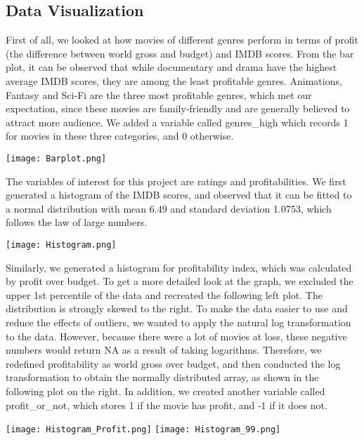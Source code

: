 \documentclass[12pt]{article}
\begin{document}
\subsection{Data Visualization}
First of all, we looked at how movies of different genres perform in terms of profit (the difference between world gross and budget) and IMDB scores. From the bar plot, it can be observed that while documentary and drama have the highest average IMDB scores, they are among the least profitable genres. Animations, Fantasy and Sci-Fi are the three most profitable genres, which met our expectation, since these movies are family-friendly and are generally believed to attract more audience. We added a variable called genres\_high which records 1 for movies in these three categories, and 0 otherwise. \par
\begin{center}
\texttt{[image: Barplot.png]}\\
\end{center}
\par
The variables of interest for this project are ratings and profitabilities. We first generated a histogram of the IMDB scores, and observed that it can be fitted to a normal distribution with mean 6.49 and standard deviation 1.0753, which follows the law of large numbers. 
\begin{center}
\texttt{[image: Histogram.png]}\\
\end{center}
\par
Similarly, we generated a histogram for profitability index, which was calculated by profit over budget. To get a more detailed look at the graph, we excluded the upper 1st percentile of the data and recreated the following left plot. The distribution is strongly skewed to the right. To make the data easier to use and reduce the effects of outliers, we wanted to apply the natural log transformation to the data. However, because there were a lot of movies at loss, these negative numbers would return NA as a result of taking logarithms. Therefore, we redefined profitability as world gross over budget, and then conducted the log transformation to obtain the normally distributed array, as shown in the following plot on the right. In addition, we created another variable called profit\_or\_not, which stores 1 if the movie has profit, and -1 if it does not. 
\begin{center}
\texttt{[image: Histogram\_Profit.png]}
\texttt{[image: Histogram\_99.png]}\\
\end{center}
\end{document}
